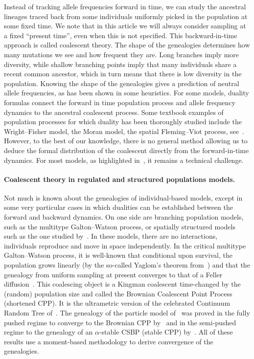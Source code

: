 \begin{refsegment}
Instead of tracking allele frequencies forward in time, we can study the ancestral lineages traced back from some individuals uniformly picked in the population at some fixed time. We note that in this article we will always consider sampling at a fixed ``present time'', even when this is not specified. This backward-in-time approach is called coalescent theory. The shape of the genealogies determines how many mutations we see and how frequent they are. Long branches imply more diversity, while shallow branching points imply that many individuals share a recent common ancestor, which in turn means that there is low diversity in the population. Knowing the shape of the genealogies gives a prediction of neutral allele frequencies, as has been shown in some heuristics. For some models, duality formulas connect the forward in time population process and allele frequency dynamics to the ancestral coalescent process. Some textbook examples of population processes for which duality has been thoroughly studied include the Wright--Fisher model, the Moran model, the spatial Fleming--Viot process, see~\cite{carinci_dualities_2015}. 
However, to the best of our knowledge, there is no general method allowing us to deduce the formal distribution of the coalescent directly from the forward-in-time dynamics. For most models, as highlighted in~\cite{Julie_Zsofia}, it remains a technical challenge.

\paragraph{Coalescent theory in regulated and structured populations models.} 
Not much is known about the genealogies of individual-based models, except in some very particular cases in which dualities can be established between the forward and backward dynamics.
On one side are branching population models, such as the multitype Galton--Watson process, or spatially structured models such as the one studied by~\cite{julie_tourniaire_branching_2024}. In these models, there are no interactions, individuals reproduce and move in space independently. 
In the critical multitype Galton--Watson process, it is well-known that conditional upon survival, the population grows linearly (by the so-called Yaglom's theorem from~\cite{kesten_galton-watson_1966}) and that the genealogy from uniform sampling at present converges to that of a Feller diffusion~\citep{7_authors_paper}.
This coalescing object is a  Kingman coalescent time-changed by the (random) population size and called the Brownian Coalescent Point Process (shortened CPP). It is the ultrametric version of the celebrated Continuum Random Tree of~\cite{aldous_continuum_1991}. 
The genealogy of the particle model of~\cite{julie_tourniaire_branching_2024} was proved in the fully pushed regime to converge to the Brownian CPP by~\cite{schertzer2023spectral} and in the semi-pushed regime to the genealogy of an $\alpha$-stable CSBP (stable CPP) by~\cite{foutel-rodier_convergence_2024}. 
All of these results use a moment-based methodology to derive convergence of the genealogies.


\end{refsegment}
